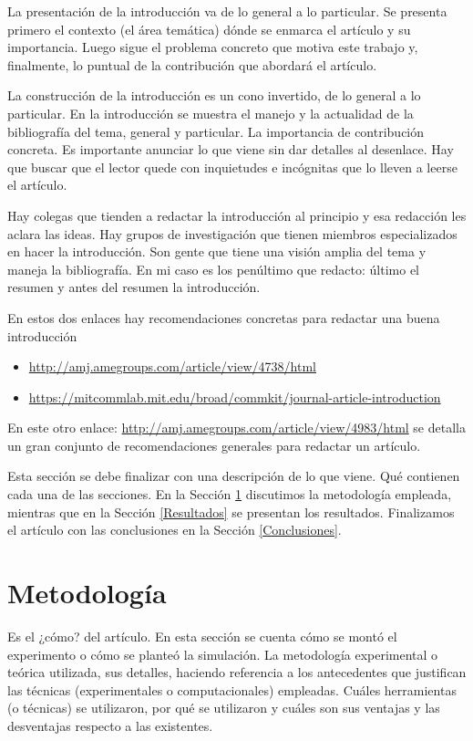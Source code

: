 \documentclass[spanish,notitlepage,letterpaper,11pt]{article} %
\begin{document}
La presentación de la introducción va de lo general a lo particular. Se presenta primero el contexto (el área temática) dónde se enmarca el artículo y su importancia. Luego sigue el problema concreto que motiva este trabajo y, finalmente, lo puntual de la contribución que abordará el artículo. 

La construcción de la introducción es un cono invertido, de lo general a lo particular. En la introducción se muestra el manejo y la actualidad de la bibliografía del tema, general y particular.  La importancia de contribución concreta. Es importante anunciar lo que viene sin dar detalles al desenlace. Hay que buscar que el lector quede con inquietudes e incógnitas que lo lleven a leerse el artículo. 

Hay colegas que tienden a redactar la introducción al principio y esa redacción les aclara las ideas. Hay grupos de investigación que tienen miembros especializados en hacer la introducción. Son gente que tiene una visión amplia del tema y maneja la bibliografía.  En mi caso es los penúltimo que redacto: último el resumen y antes del resumen la introducción. 

En estos dos enlaces hay recomendaciones concretas para redactar una buena introducción
\begin{itemize}
    \item \url{http://amj.amegroups.com/article/view/4738/html}
    \item \url{https://mitcommlab.mit.edu/broad/commkit/journal-article-introduction} 
\end{itemize}

En este otro enlace: \url{http://amj.amegroups.com/article/view/4983/html} se detalla un gran conjunto de recomendaciones generales para redactar un artículo.

Esta sección se debe finalizar con una descripción de lo que viene. Qué contienen cada una de las secciones. En la Sección \ref{Metodologia} discutimos la metodología empleada, mientras que en la Sección \ref{Resultados} se presentan los resultados. Finalizamos el artículo con las conclusiones en la Sección \ref{Conclusiones}.


\section{Metodología}
\label{Metodologia}

Es el ¿cómo? del artículo. En esta sección se cuenta cómo se montó el experimento o cómo se planteó la simulación. La metodología experimental o teórica utilizada, sus detalles, haciendo referencia a los antecedentes que justifican las técnicas (experimentales o computacionales) empleadas. Cuáles herramientas (o técnicas) se utilizaron, por qué se utilizaron y cuáles son sus ventajas y las desventajas respecto a las existentes. 
\end{document}
